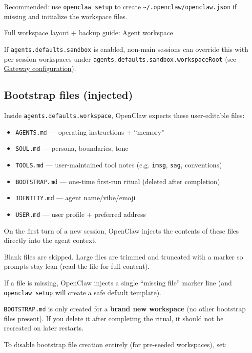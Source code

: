 Recommended: use \texttt{openclaw setup} to create \texttt{\textasciitilde{}/.openclaw/openclaw.json} if missing and initialize the workspace files.

Full workspace layout + backup guide: \href{/concepts/agent-workspace}{Agent workspace}

If \texttt{agents.defaults.sandbox} is enabled, non-main sessions can override this with
per-session workspaces under \texttt{agents.defaults.sandbox.workspaceRoot} (see
\href{/gateway/configuration}{Gateway configuration}).

\subsection{Bootstrap files (injected)}


Inside \texttt{agents.defaults.workspace}, OpenClaw expects these user-editable files:

\begin{itemize}
  \item \texttt{AGENTS.md} — operating instructions + “memory”
  \item \texttt{SOUL.md} — persona, boundaries, tone
  \item \texttt{TOOLS.md} — user-maintained tool notes (e.g. \texttt{imsg}, \texttt{sag}, conventions)
  \item \texttt{BOOTSTRAP.md} — one-time first-run ritual (deleted after completion)
  \item \texttt{IDENTITY.md} — agent name/vibe/emoji
  \item \texttt{USER.md} — user profile + preferred address
\end{itemize}


On the first turn of a new session, OpenClaw injects the contents of these files directly into the agent context.

Blank files are skipped. Large files are trimmed and truncated with a marker so prompts stay lean (read the file for full content).

If a file is missing, OpenClaw injects a single “missing file” marker line (and \texttt{openclaw setup} will create a safe default template).

\texttt{BOOTSTRAP.md} is only created for a \textbf{brand new workspace} (no other bootstrap files present). If you delete it after completing the ritual, it should not be recreated on later restarts.

To disable bootstrap file creation entirely (for pre-seeded workspaces), set:

